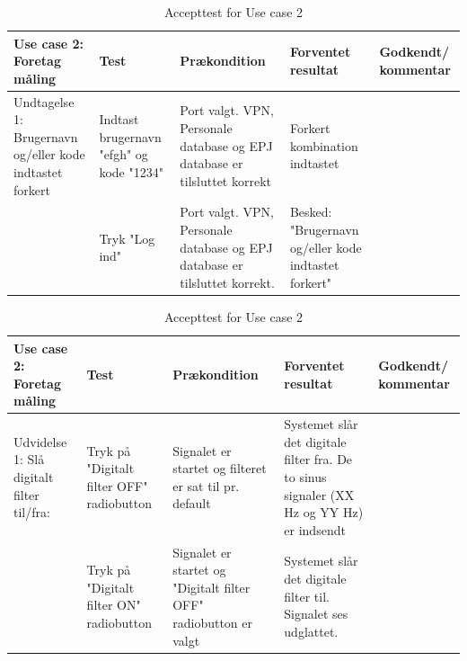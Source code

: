 \begin{table}[H]
\caption{Accepttest for Use case 2}\label{tab:tabel10}
\begin{tabular}{|>{\raggedright\arraybackslash}p{2.5cm}| >{\raggedright\arraybackslash}p{2.9cm} | >{\raggedright\arraybackslash}p{2.9cm} | >{\raggedright\arraybackslash}p{2.9cm} | >{\raggedright\arraybackslash}p{2.8cm} |}
   \hline
   \textbf{Use case 2: Foretag måling} &\textbf{Test}& \textbf{Prækondition} & \textbf{Forventet resultat} & \textbf{Godkendt/ kommentar}\\ \hline
   Undtagelse 1: Brugernavn og/eller kode indtastet forkert & Indtast brugernavn "efgh" og kode "1234"& Port valgt. VPN, Personale database og EPJ database er tilsluttet korrekt & Forkert kombination indtastet &  \\\hline
   &Tryk "Log ind" & Port valgt. VPN, Personale database og EPJ database er tilsluttet korrekt. & Besked: "Brugernavn og/eller kode indtastet forkert" &\\\hline
\end{tabular}
\end{table}



\begin{table}[H]
\caption{Accepttest for Use case 2}\label{tab:tabel11}
\begin{tabular}{|>{\raggedright\arraybackslash}p{2.5cm}| >{\raggedright\arraybackslash}p{2.9cm} | >{\raggedright\arraybackslash}p{2.9cm} | >{\raggedright\arraybackslash}p{2.9cm} | >{\raggedright\arraybackslash}p{2.8cm} |}
   \hline
   \textbf{Use case 2: Foretag måling} &\textbf{Test}& \textbf{Prækondition} & \textbf{Forventet resultat} & \textbf{Godkendt/ kommentar}\\ \hline
   Udvidelse 1: Slå digitalt filter til/fra:& Tryk på "Digitalt filter OFF" radiobutton & Signalet er startet og filteret er sat til pr. default & Systemet slår det digitale filter fra. De to sinus signaler (XX Hz og YY Hz) er indsendt &\\\hline
   &Tryk på "Digitalt filter ON" radiobutton & Signalet er startet og "Digitalt filter OFF" radiobutton er valgt & Systemet slår det digitale filter til. Signalet ses udglattet. &\\\hline
\end{tabular}
\end{table}


